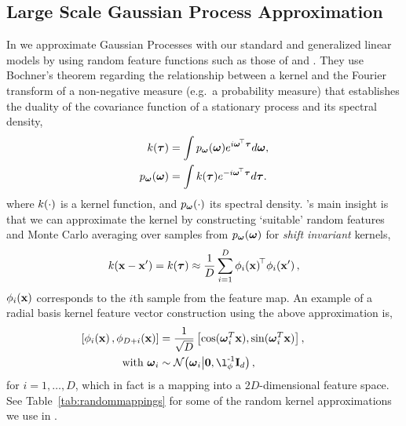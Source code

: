 \documentclass[11pt, oneside]{article}
\begin{document}
\subsection{Large Scale Gaussian Process Approximation}

In \revrand we approximate Gaussian Processes \citep{Rasmussen2006} with
our standard and generalized linear models by using random feature functions
such as those of \citeauthor{rahimi2007} \citeyearpar{rahimi2007,rahimi2008}
and \cite{le2013fastfood}. They use Bochner's theorem regarding the
relationship between a kernel and the Fourier transform of a non-negative
measure (e.g.~a probability measure) that establishes the duality of the
covariance function of a stationary process and its spectral density,
\begin{align}
	k(\boldsymbol{\tau}) &= \int p_{\boldsymbol{\omega}}(\boldsymbol{\omega}) 
    e^{i \boldsymbol{\omega}^{\!\top}  \boldsymbol{\tau}} d \boldsymbol{\omega},  \\
	p_{\boldsymbol{\omega}}(\boldsymbol{\omega}) &= \int k(\boldsymbol{\tau}) 
    e^{- i \boldsymbol{\omega}^{\!\top} \boldsymbol{\tau}}  d \boldsymbol{\tau}.
	\label{eq:fourier}
\end{align}
where $k(\cdot)$ is a kernel function, and $p_{\boldsymbol{\omega}}(\cdot)$ its
spectral density. \citeauthor{rahimi2007}'s  main insight
\citeyearpar{rahimi2007} is that we can approximate the kernel by constructing
`suitable' random features and Monte Carlo averaging over samples from
$p_{\boldsymbol{\omega}}(\boldsymbol{\omega})$ for \emph{shift invariant} kernels,
\begin{equation}
    k(\mathbf{x} - \mathbf{x}') = k(\boldsymbol{\tau}) 
    \approx \frac{1}{D} \sum_{i=1}^{D} \phi_{i}\!\left({{\mathbf{x}}}\right)^{\!\top}\!
	\phi_{i}\!\left({{\mathbf{x}'}}\right),
	\label{eq:mcapprox}
\end{equation}
$\phi_{i}\!\left({{\mathbf{x}}}\right)$ corresponds to the $i$th sample from the feature
map. An example of a radial basis kernel feature vector construction using the 
above approximation is,
\begin{align}
	\nonumber
    \sbrac{\singlefeatfunc{\inss}{i}, \singlefeatfunc{\inss}{D+i}}&= 
    \frac{1}{\sqrt{D}} \sbrac{\cos(\ffourier_i^T \inss), 
    \sin(\ffourier_i^T \inss)}, \qquad \\
    \text{with}~\ffourier_i & \sim 
    \gausC{\ffourier_i}{\mathbf{0}, \lenscale\inv \ident{d}},
\end{align}
for $i=1, \ldots, D$,  which in fact is a mapping into a $2 D$-dimensional
feature space. See Table~\ref{tab:randommappings} for some of the random kernel
approximations we use in \revrand.
\end{document}
